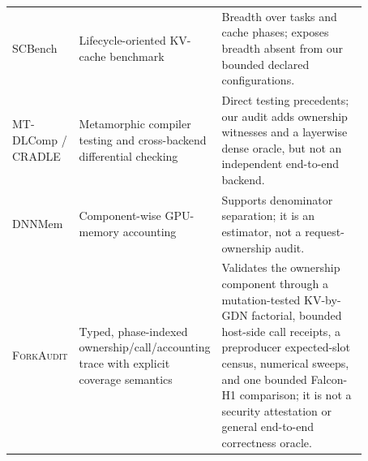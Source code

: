 \documentclass{article}
\newcommand{\method}{\textsc{ForkAudit}}
\begin{document}
\begin{table}[H]
\begin{tabular}{@{}p{0.16\linewidth}p{0.28\linewidth}p{0.43\linewidth}@{}}
    SCBench & Lifecycle-oriented KV-cache benchmark~\citep{li2025scbench} & Breadth over tasks and cache phases; exposes breadth absent from our bounded declared configurations. \\
    MT-DLComp / CRADLE & Metamorphic compiler testing and cross-backend differential checking~\citep{xiao2022metamorphic,pham2019cradle} & Direct testing precedents; our audit adds ownership witnesses and a layerwise dense oracle, but not an independent end-to-end backend. \\
    DNNMem & Component-wise GPU-memory accounting~\citep{gao2020dnnmem} & Supports denominator separation; it is an estimator, not a request-ownership audit. \\
    \method{} & Typed, phase-indexed ownership/call/accounting trace with explicit coverage semantics & Validates the ownership component through a mutation-tested KV-by-GDN factorial, bounded host-side call receipts, a preproducer expected-slot census, numerical sweeps, and one bounded Falcon-H1 comparison; it is not a security attestation or general end-to-end correctness oracle. \\
    \bottomrule
  \end{tabular}
\end{table}
\end{document}
